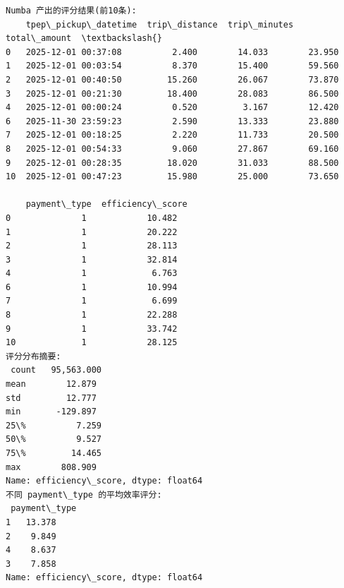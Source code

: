 \documentclass[11pt]{article}
\makeatletter
\newcommand{\boxspacing}{\kern\kvtcb@left@rule\kern\kvtcb@boxsep}
\newcommand{\prompt}[4]{
        {\ttfamily\llap{{\color{#2}[#3]:\hspace{3pt}#4}}\vspace{-\baselineskip}}
    }
\makeatother
\begin{document}
    \begin{Verbatim}[commandchars=\\\{\}]
Numba 产出的评分结果(前10条):
    tpep\_pickup\_datetime  trip\_distance  trip\_minutes  total\_amount  \textbackslash{}
0   2025-12-01 00:37:08          2.400        14.033        23.950
1   2025-12-01 00:03:54          8.370        15.400        59.560
2   2025-12-01 00:40:50         15.260        26.067        73.870
3   2025-12-01 00:21:30         18.400        28.083        86.500
4   2025-12-01 00:00:24          0.520         3.167        12.420
6   2025-11-30 23:59:23          2.590        13.333        23.880
7   2025-12-01 00:18:25          2.220        11.733        20.500
8   2025-12-01 00:54:33          9.060        27.867        69.160
9   2025-12-01 00:28:35         18.020        31.033        88.500
10  2025-12-01 00:47:23         15.980        25.000        73.650

    payment\_type  efficiency\_score
0              1            10.482
1              1            20.222
2              1            28.113
3              1            32.814
4              1             6.763
6              1            10.994
7              1             6.699
8              1            22.288
9              1            33.742
10             1            28.125
评分分布摘要:
 count   95,563.000
mean        12.879
std         12.777
min       -129.897
25\%          7.259
50\%          9.527
75\%         14.465
max        808.909
Name: efficiency\_score, dtype: float64
不同 payment\_type 的平均效率评分:
 payment\_type
1   13.378
2    9.849
4    8.637
3    7.858
Name: efficiency\_score, dtype: float64
    \end{Verbatim}

    \begin{tcolorbox}[breakable, size=fbox, boxrule=1pt, pad at break*=1mm,colback=cellbackground, colframe=cellborder]
\prompt{In}{incolor}{ }{\boxspacing}
\begin{Verbatim}[commandchars=\\\{\}]

\end{Verbatim}
\end{tcolorbox}


    
    
    
\end{document}
